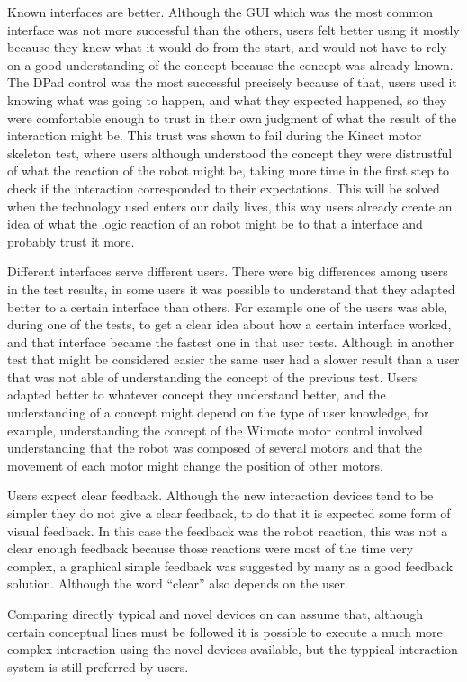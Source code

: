 	Known interfaces are better. Although the \ac{GUI} which was the most common interface was not more successful than the others, users felt better using it mostly because they knew what it would do from the start, and would not have to rely on a good understanding of the concept because the concept was already known. The \ac{DPad} control was the most successful precisely because of that, users used it knowing what was going to happen, and what they expected happened, so they were comfortable enough to trust in their own judgment of what the result of the interaction might be. This trust was shown to fail during the Kinect motor skeleton test, where users although understood the concept they were distrustful of what the reaction of the robot might be, taking more time in the first step to check if the interaction corresponded to their expectations. This will be solved when the technology used enters our daily lives, this way users already create an idea of what the logic reaction of an robot might be to that a interface and probably trust it more.
	
	Different interfaces serve different users. There were big differences among users in the test results, in some users it was possible to understand that they adapted better to a certain interface than others. For example one of the users was able, during one of the tests, to get a clear idea about how a certain interface worked, and that interface became the fastest one in that user tests. Although in another test that might be considered easier the same user had a slower result than a user that was not able of understanding the concept of the previous test. Users adapted better to whatever concept they understand better, and the understanding of a concept might depend on the type of user knowledge, for example, understanding the concept of the \ac{Wiimote} motor control involved understanding that the robot was composed of several motors and that the movement of each motor might change the position of other motors.
	
	Users expect clear feedback. Although the new interaction devices tend to be simpler they do not give a clear feedback, to do that it is expected some form of visual feedback. In this case the feedback was the robot reaction, this was not a clear enough feedback because those reactions were most of the time very complex, a graphical simple feedback was suggested by many as a good feedback solution. Although the word ``clear'' also depends on the user. 
	
	Comparing directly typical and novel devices on can assume that, although certain conceptual lines must be followed it is possible to execute a much more complex interaction using the novel devices available, but the typpical interaction system is still preferred by users.

